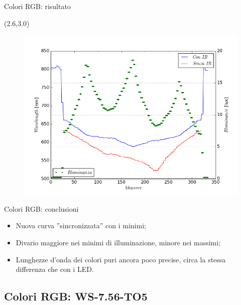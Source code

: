 \documentclass{beamer}
\begin{document}
\begin{frame}{Colori RGB: risultato}
\begin{textblock}{9}(2.6,3.0)\begin{figure}
\includegraphics[scale=.42]{comparison3}
\end{figure}
\end{textblock}
\end{frame}

\begin{frame}{Colori RGB: conclusioni}
\begin{itemize}
\item Nuova curva ''sincronizzata'' con i minimi;\\
\item Divario maggiore nei minimi di illuminazione, minore nei massimi;\\
\item Lunghezze d'onda dei colori puri ancora poco precise, circa la stessa differenza che con i LED.
\end{itemize}
\end{frame}

\subsection{Colori RGB: WS-7.56-TO5}
\end{document}
